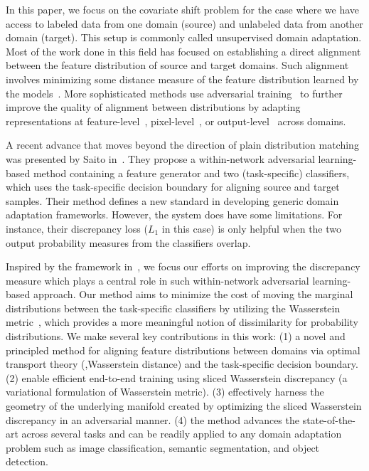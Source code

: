 \documentclass[10pt,twocolumn,letterpaper]{article}
\begin{document}
In this paper, we focus on the covariate shift problem for the case where we have access to labeled data from one domain (source) and unlabeled data from another domain (target). This setup is commonly called unsupervised domain adaptation.
 Most of the work done in this field has focused on establishing a direct alignment between the feature distribution of source and target domains.
 Such alignment involves minimizing some distance measure of the feature distribution learned by the models~\cite{saenko2010adapting, ganin2014unsupervised, long2015learning}.
 More sophisticated methods use adversarial training~\cite{goodfellow2014generative} to further improve the quality of alignment between distributions by adapting representations at feature-level~\cite{hoffman2016fcns, ganin2016domain}, pixel-level~\cite{liu2016coupled, tzeng2017adversarial, bousmalis2017unsupervised}, or output-level~\cite{tsai2018learning} across domains.
 
A recent advance that moves beyond the direction of plain distribution matching was presented by Saito \etal in~\cite{saito2017maximum}.
They propose a within-network adversarial learning-based method containing a feature generator and two (task-specific) classifiers, which uses the task-specific decision boundary for aligning source and target samples.
Their method defines a new standard in developing generic domain adaptation frameworks. However, the system does have some limitations. For instance, their discrepancy loss ($L_1$ in this case) is only helpful when the two output probability measures from the classifiers overlap.


Inspired by the framework in~\cite{saito2017maximum}, we focus our efforts on improving the discrepancy measure which plays a central role in such within-network adversarial learning-based approach.
Our method aims to minimize the cost of moving the marginal distributions between the task-specific classifiers by utilizing the Wasserstein metric~\cite{monge1781memoire, kantorovitch1958translocation, arjovsky2017wasserstein}, which provides a more meaningful notion of dissimilarity for probability distributions.
We make several key contributions in this work:
(1) a novel and principled method for aligning feature distributions between domains via optimal transport theory (\ie,Wasserstein distance) and the task-specific decision boundary.
(2) enable efficient end-to-end training using sliced Wasserstein discrepancy (a variational formulation of Wasserstein metric).
(3) effectively harness the geometry of the underlying manifold created by optimizing the sliced Wasserstein discrepancy in an adversarial manner.
(4) the method advances the state-of-the-art across several tasks and can be readily applied to any domain adaptation problem such as image classification, semantic segmentation, and object detection.
\end{document}
